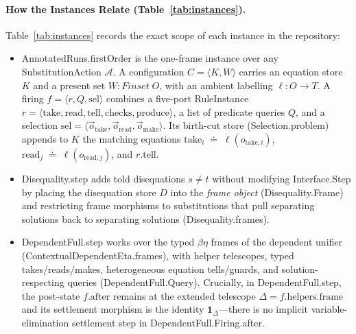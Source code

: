 \documentclass[11pt,a4paper]{article}
\theoremstyle{definition}
\DeclareRobustCommand{\lean}[1]{%
  \ifmmode\text{\normalfont\ttfamily\footnotesize\detokenize{#1}}%
  \else{\normalfont\footnotesize\leanurl{#1}}\fi}
\def\lean#1{#1}%
\newcommand{\doteqStore}{\;\doteq\;}
\begin{document}
\paragraph{How the Instances Relate (Table~\ref{tab:instances}).}
Table~\ref{tab:instances} records the exact scope of each instance in the repository:
\begin{itemize}[leftmargin=1.8em, nosep]
  \item \lean{AnnotatedRuns.firstOrder} is the one-frame instance over any \lean{SubstitutionAction} $\mathcal{A}$. A configuration $C = \langle K, W \rangle$ carries an equation store $K$ and a present set $W : \lean{Finset}\;O$, with an ambient labelling $\ell : O \to T$. A firing $f = \langle r, Q, \mathrm{sel} \rangle$ combines a five-port \lean{RuleInstance} $r = \langle \mathrm{take}, \mathrm{read}, \mathrm{tell}, \mathrm{checks}, \mathrm{produce} \rangle$, a list of predicate queries $Q$, and a selection $\mathrm{sel} = \langle \vec{o}_{\mathrm{take}}, \vec{o}_{\mathrm{read}}, \vec{o}_{\mathrm{make}} \rangle$. Its birth-cut store (\lean{Selection.problem}) appends to $K$ the matching equations $\mathrm{take}_i \doteqStore \ell(o_{\mathrm{take},i})$, $\mathrm{read}_j \doteqStore \ell(o_{\mathrm{read},j})$, and $r.\mathrm{tell}$.
  \item \lean{Disequality.step} adds told disequations $s \neq t$ without modifying \lean{Interface.Step} by placing the disequation store $D$ into the \emph{frame object} (\lean{Disequality.Frame}) and restricting frame morphisms to substitutions that pull separating solutions back to separating solutions (\lean{Disequality.frames}).
  \item \lean{DependentFull.step} works over the typed $\beta\eta$ frames of the dependent unifier (\lean{ContextualDependentEta.frames}), with helper telescopes, typed takes/reads/makes, heterogeneous equation tells/guards, and solution-respecting queries (\lean{DependentFull.Query}). Crucially, in \lean{DependentFull.step}, the post-state $f.\mathrm{after}$ remains at the extended telescope $\Delta = f.\mathrm{helpers}.\mathrm{frame}$ and its settlement morphism is the identity $\mathbf{1}_{\Delta}$---there is no implicit variable-elimination settlement step in \lean{DependentFull.Firing.after}.
\end{itemize}
\end{document}
